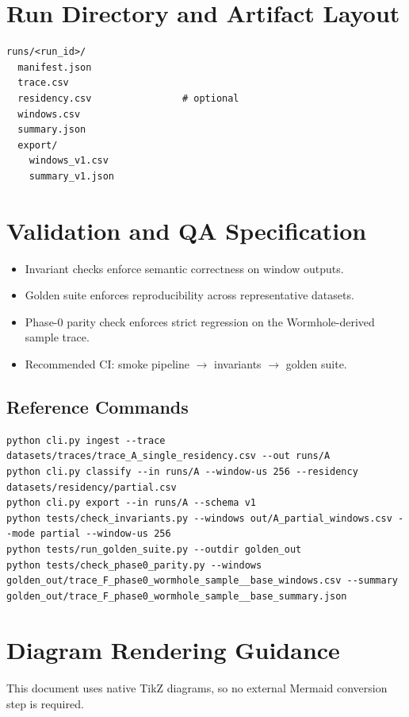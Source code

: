 \documentclass[11pt,a4paper]{article}
\begin{document}
\section{Run Directory and Artifact Layout}
\begin{lstlisting}[basicstyle=\ttfamily\small,frame=single]
runs/<run_id>/
  manifest.json
  trace.csv
  residency.csv                # optional
  windows.csv
  summary.json
  export/
    windows_v1.csv
    summary_v1.json
\end{lstlisting}

\section{Validation and QA Specification}
\begin{itemize}[leftmargin=1.4em]
  \item Invariant checks enforce semantic correctness on window outputs.
  \item Golden suite enforces reproducibility across representative datasets.
  \item Phase-0 parity check enforces strict regression on the Wormhole-derived sample trace.
  \item Recommended CI: smoke pipeline $\rightarrow$ invariants $\rightarrow$ golden suite.
\end{itemize}

\subsection{Reference Commands}
\begin{lstlisting}[basicstyle=\ttfamily\small,frame=single]
python cli.py ingest --trace datasets/traces/trace_A_single_residency.csv --out runs/A
python cli.py classify --in runs/A --window-us 256 --residency datasets/residency/partial.csv
python cli.py export --in runs/A --schema v1
python tests/check_invariants.py --windows out/A_partial_windows.csv --mode partial --window-us 256
python tests/run_golden_suite.py --outdir golden_out
python tests/check_phase0_parity.py --windows golden_out/trace_F_phase0_wormhole_sample__base_windows.csv --summary golden_out/trace_F_phase0_wormhole_sample__base_summary.json
\end{lstlisting}

\section{Diagram Rendering Guidance}
This document uses native TikZ diagrams, so no external Mermaid conversion step is required.
\end{document}
